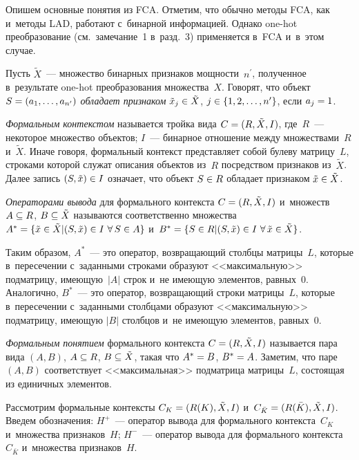 \begin{multicols}{2}
  Опишем основные понятия из FCA. Отметим, что обычно методы FCA, как 
и~методы LAD, работают с~бинарной информацией. Однако one-hot 
преобразование (см.\ замечание~1 в~разд.~3) применяется в~FCA и~в~этом 
случае. 
  
  Пусть $\tilde{X}$~--- множество бинарных признаков мощ\-ности~$n^\prime$, 
полученное в~результате one-hot преобразования множества~$X$. Говорят, что 
объект $S\hm= (a_1, \ldots , a_{n^\prime})$ \textit{обладает при\-зна\-ком} 
$\tilde{x}_j\hm\in \tilde{X}$, $j\hm\in \{1,2,\ldots , n^\prime\}$, если $a_j\hm=1$. 
  
  \textit{Формальным контекстом} называется трой\-ка вида $C\hm= (R, 
\tilde{X}, I)$, где~$R$~--- некоторое множество объектов; $I$~--- бинарное 
отношение меж\-ду множествами~$R$ и~$\tilde{X}$. Иначе говоря, формальный 
кон\-текст пред\-став\-ля\-ет собой булеву мат\-ри\-цу~$L$, строками которой служат 
описания объектов из~$R$ по\-сред\-ст\-вом признаков из~$\tilde{X}$. Далее запись 
$(S, \tilde{x})\hm\in I$ означает, что объект $S\hm\in R$ обладает при\-зна\-ком 
$\tilde{x}\hm\in \tilde{X}$.
  
  \textit{Операторами вывода} для формального кон\-текс\-та $C\hm= 
(R,\tilde{X},I)$ и~множеств $A\hm\subseteq R$, $B\hm\subseteq \tilde{X}$ 
называются соответственно множества $A^*\hm= \{ \tilde{x}\hm\in 
\tilde{X}\vert (S,\tilde{x})\hm\in I\ \forall\,S \hm\in A\}$ и~$B^*\hm= \{ S\hm\in 
R\vert (S,\tilde{x})\hm\in I\ \forall\, \tilde{x}\hm\in \tilde{X}\}$.
  
  Таким образом, $A^*$~--- это оператор, воз\-вра\-ща\-ющий столб\-цы  
мат\-ри\-цы~$L$, которые в~пересечении с~заданными строками образуют 
<<максимальную>> под\-мат\-ри\-цу, име\-ющую~$\vert A\vert$ строк и~не 
име\-ющую элементов, рав\-ных~0. Аналогично, $B^*$~--- это оператор, 
воз\-вра\-ща\-ющий строки мат\-ри\-цы~$L$, которые в~пересечении с~заданными 
столб\-ца\-ми образуют <<максимальную>> под\-мат\-ри\-цу, име\-ющую $\vert 
B\vert$ столб\-цов и~не име\-ющую элементов, рав\-ных~0.
  
  \textit{Формальным понятием} формального кон\-текс\-та $C\hm= 
(R,\tilde{X}, I)$ называется пара вида $(A,B)$, $A\hm\subseteq R$, 
$B\hm\subseteq \tilde{X}$, такая что $A^*\hm= B$, $B^*\hm= A$. Заметим, что 
паре $(A,B)$ соответствует <<максимальная>> под\-мат\-рица мат\-ри\-цы~$L$, 
со\-сто\-ящая из единичных элементов.
  
  Рассмотрим формальные кон\-текс\-ты $C_K\hm= (R(K),\tilde{X},I)$ 
и~$C_{\bar{K}}\hm= (R(\bar{K}),\tilde{X},I)$. Введем обозначения: $H^+$~--- 
оператор вывода для формального кон\-текс\-та~$C_K$ и~множества 
при\-зна\-ков~$H$; $H^-$~--- оператор вывода для формального 
кон\-текс\-та~$C_{\bar{K}}$ и~множества при\-зна\-ков~$H$. 
  

\end{multicols}
